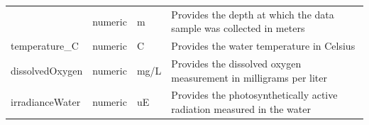 \documentclass[12pt,]{article}
\begin{document}
\begin{longtable}[]{@{}llll@{}}
\begin{minipage}[t]{0.24\columnwidth}
\end{minipage} & \begin{minipage}[t]{0.15\columnwidth}\raggedright
numeric\strut
\end{minipage} & \begin{minipage}[t]{0.12\columnwidth}\raggedright
m\strut
\end{minipage} & \begin{minipage}[t]{0.38\columnwidth}\raggedright
Provides the depth at which the data sample was collected in
meters\strut
\end{minipage}\tabularnewline
\begin{minipage}[t]{0.24\columnwidth}\raggedright
temperature\_C\strut
\end{minipage} & \begin{minipage}[t]{0.15\columnwidth}\raggedright
numeric\strut
\end{minipage} & \begin{minipage}[t]{0.12\columnwidth}\raggedright
C\strut
\end{minipage} & \begin{minipage}[t]{0.38\columnwidth}\raggedright
Provides the water temperature in Celsius\strut
\end{minipage}\tabularnewline
\begin{minipage}[t]{0.24\columnwidth}\raggedright
dissolvedOxygen\strut
\end{minipage} & \begin{minipage}[t]{0.15\columnwidth}\raggedright
numeric\strut
\end{minipage} & \begin{minipage}[t]{0.12\columnwidth}\raggedright
mg/L\strut
\end{minipage} & \begin{minipage}[t]{0.38\columnwidth}\raggedright
Provides the dissolved oxygen measurement in milligrams per liter\strut
\end{minipage}\tabularnewline
\begin{minipage}[t]{0.24\columnwidth}\raggedright
irradianceWater\strut
\end{minipage} & \begin{minipage}[t]{0.15\columnwidth}\raggedright
numeric\strut
\end{minipage} & \begin{minipage}[t]{0.12\columnwidth}\raggedright
uE\strut
\end{minipage} & \begin{minipage}[t]{0.38\columnwidth}\raggedright
Provides the photosynthetically active radiation measured in the water

\end{minipage}
\end{longtable}
\end{document}
